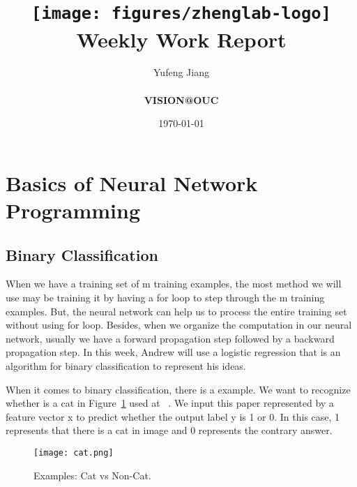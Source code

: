 \documentclass[a4paper]{article}
\title{
    \vspace*{1in}
    \texttt{[image: figures/zhenglab-logo]} \\
    \vspace*{1.2in}
    \textbf{\huge Weekly Work Report}
    \vspace{0.2in}
}
\author{Yufeng Jiang \\
    \vspace*{0.5in} \\
    \textbf{VISION@OUC} \\
    \vspace*{1in}
}
\date{\today}
\begin{document}
\maketitle
\setcounter{page}{0}
\thispagestyle{empty}
\newpage

\section{Basics of Neural Network Programming}

\subsection{Binary Classification}

When we have a training set of m training examples, the most method we will use may be training it by having a for loop to step through the m training examples. But, the neural network can help us to process the entire training set without using for loop. Besides, when we organize the computation in our neural network, usually we have a forward propagation step followed by a backward propagation step. In this week, Andrew will use a logistic regression that is an algorithm for binary classification to represent his ideas. 

When it comes to binary classification, there is a example. We want to recognize whether is a cat in Figure~\ref{fig1} used at~\cite{Neural} . We input this paper represented by a feature vector x to predict whether the output label y is 1 or 0. In this case, 1 represents that there is a cat in image and 0 represents the contrary answer. 

\begin{figure}[hb]
\begin{center}
\texttt{[image: cat.png]}
\end{center}
\caption{Examples: Cat vs Non-Cat.}
\label{fig1}
\end{figure}
\end{document}
